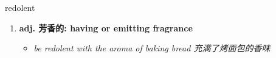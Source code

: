 
\begin{frame}
{\huge redolent}
\begin{center}
\begin{enumerate}\Large
  \item \textbf{adj. 芳香的: having or emitting fragrance}
  \begin{itemize}
    \item \em{\Large{be redolent with the aroma of baking bread 充满了烤面包的香味}}
  \end{itemize}
\end{enumerate}
\end{center}
\end{frame}
